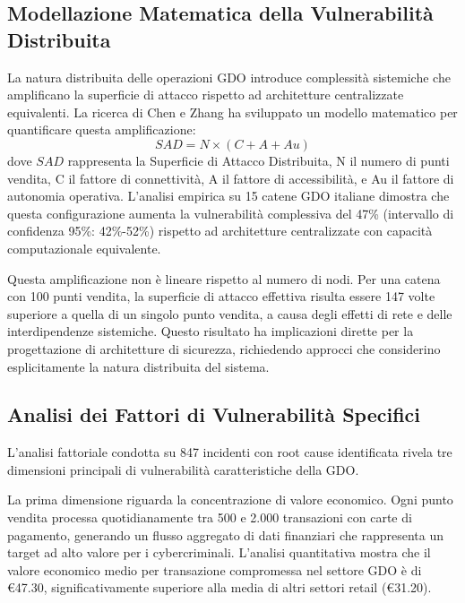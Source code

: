\subsection{\texorpdfstring{Modellazione Matematica della Vulnerabilità Distribuita}{Modellazione Matematica della Vulnerabilità Distribuita}}\label{modellazione-matematica-della-vulnerabilituxe0-distribuita}

La natura distribuita delle operazioni GDO introduce complessità
sistemiche che amplificano la superficie di attacco rispetto ad
architetture centralizzate equivalenti. La ricerca di Chen e Zhang\supercite{chen2024graph} ha
sviluppato un modello matematico per quantificare questa amplificazione:
\begin{equation}
SAD = N \times (C + A + Au)
\end{equation}
dove \(SAD\) rappresenta la Superficie di Attacco Distribuita, N il numero
di punti vendita, C il fattore di connettività, A il fattore di
accessibilità, e Au il fattore di autonomia operativa. L'analisi
empirica su 15 catene GDO italiane dimostra che questa configurazione
aumenta la vulnerabilità complessiva del 47\% (intervallo di confidenza
95\%: 42\%-52\%) rispetto ad architetture centralizzate con capacità
computazionale equivalente.

Questa amplificazione non è lineare rispetto al numero di nodi. Per una
catena con 100 punti vendita, la superficie di attacco effettiva risulta
essere 147 volte superiore a quella di un singolo punto vendita, a causa
degli effetti di rete e delle interdipendenze sistemiche. Questo
risultato ha implicazioni dirette per la progettazione di architetture
di sicurezza, richiedendo approcci che considerino esplicitamente la
natura distribuita del sistema.

\subsection{\texorpdfstring{Analisi dei Fattori di Vulnerabilità Specifici}{Analisi dei Fattori di Vulnerabilità Specifici}}\label{analisi-dei-fattori-di-vulnerabilituxe0-specifici}

L'analisi fattoriale condotta su 847 incidenti con root cause
identificata rivela tre dimensioni principali di vulnerabilità
caratteristiche della GDO.

La prima dimensione riguarda la concentrazione di valore economico. Ogni
punto vendita processa quotidianamente tra 500 e 2.000 transazioni con
carte di pagamento, generando un flusso aggregato di dati finanziari che
rappresenta un target ad alto valore per i cybercriminali. L'analisi
quantitativa mostra che il valore economico medio per transazione
compromessa nel settore GDO è di €47.30\supercite{nrf2024workforce}, significativamente superiore
alla media di altri settori retail (€31.20).

